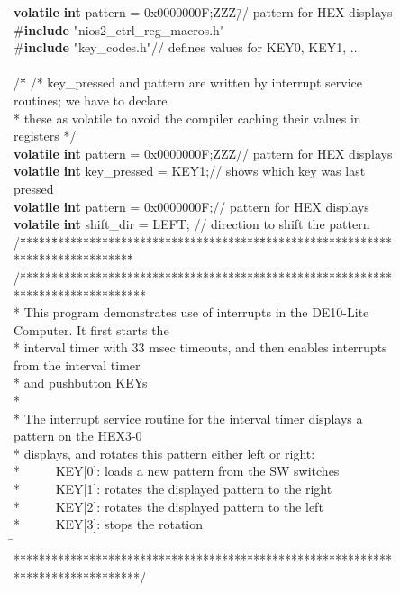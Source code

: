 \begin{figure}[h!]
\begin{center}
\begin{minipage}[t]{12.5 cm}
\begin{tabbing}
{\bf volatile}	{\bf int} pattern = 0x0000000F;ZZZ\=// pattern for HEX displays\kill
\#{\bf include} "nios2\_ctrl\_reg\_macros.h"\\
\#{\bf include} "key\_codes.h"\>// defines values for KEY0, KEY1, $\ldots$\\
~\\
/\=* \kill
/* key\_pressed and pattern are written by interrupt service routines; we have to declare \\
\>* these as volatile to avoid the compiler caching their values in registers */\\
{\bf volatile}	{\bf int} pattern = 0x0000000F;ZZZ\=// pattern for HEX displays\kill
{\bf volatile} {\bf int} key\_pressed = KEY1;\>// shows which key was last pressed\\
{\bf volatile}	{\bf int} pattern = 0x0000000F;\>// pattern for HEX displays\\
{\bf volatile}	{\bf int} shift\_dir = LEFT;	\>// direction to shift the pattern\\
/\=*****\=*********************************\=****************************************\=\kill
/********************************************************************************\\
\>* This program demonstrates use of interrupts in the DE10-Lite Computer. It first starts the \\
\>* interval timer with 33 msec timeouts, and then enables interrupts from the interval
timer\\
\>* and pushbutton KEYs\\
\>*\\
\>* The interrupt service routine for the interval timer displays a pattern on the HEX3-0\\
\>* displays, and rotates this pattern either left or right:\\
\>* ~~~~~KEY[0]: loads a new pattern from the SW switches\\
\>* ~~~~~KEY[1]: rotates the displayed pattern to the right\\
\>* ~~~~~KEY[2]: rotates the displayed pattern to the left\\
\>* ~~~~~KEY[3]: stops the rotation\\
\=\kill
\>********************************************************************************/\\

\end{tabbing}
\end{minipage}
\end{center}
\end{figure}
